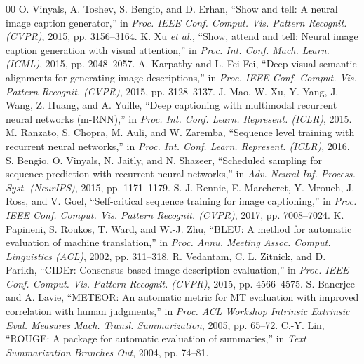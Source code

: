 \documentclass[conference]{IEEEtran}
\begin{document}
\begin{thebibliography}{00}
 O. Vinyals, A. Toshev, S. Bengio, and D. Erhan, ``Show and tell: A neural image caption generator,'' in \textit{Proc. IEEE Conf. Comput. Vis. Pattern Recognit. (CVPR)}, 2015, pp. 3156--3164.
 K. Xu \textit{et al.}, ``Show, attend and tell: Neural image caption generation with visual attention,'' in \textit{Proc. Int. Conf. Mach. Learn. (ICML)}, 2015, pp. 2048--2057.
 A. Karpathy and L. Fei-Fei, ``Deep visual-semantic alignments for generating image descriptions,'' in \textit{Proc. IEEE Conf. Comput. Vis. Pattern Recognit. (CVPR)}, 2015, pp. 3128--3137.
 J. Mao, W. Xu, Y. Yang, J. Wang, Z. Huang, and A. Yuille, ``Deep captioning with multimodal recurrent neural networks (m-RNN),'' in \textit{Proc. Int. Conf. Learn. Represent. (ICLR)}, 2015.
 M. Ranzato, S. Chopra, M. Auli, and W. Zaremba, ``Sequence level training with recurrent neural networks,'' in \textit{Proc. Int. Conf. Learn. Represent. (ICLR)}, 2016.
 S. Bengio, O. Vinyals, N. Jaitly, and N. Shazeer, ``Scheduled sampling for sequence prediction with recurrent neural networks,'' in \textit{Adv. Neural Inf. Process. Syst. (NeurIPS)}, 2015, pp. 1171--1179.
 S. J. Rennie, E. Marcheret, Y. Mroueh, J. Ross, and V. Goel, ``Self-critical sequence training for image captioning,'' in \textit{Proc. IEEE Conf. Comput. Vis. Pattern Recognit. (CVPR)}, 2017, pp. 7008--7024.
 K. Papineni, S. Roukos, T. Ward, and W.-J. Zhu, ``BLEU: A method for automatic evaluation of machine translation,'' in \textit{Proc. Annu. Meeting Assoc. Comput. Linguistics (ACL)}, 2002, pp. 311--318.
 R. Vedantam, C. L. Zitnick, and D. Parikh, ``CIDEr: Consensus-based image description evaluation,'' in \textit{Proc. IEEE Conf. Comput. Vis. Pattern Recognit. (CVPR)}, 2015, pp. 4566--4575.
 S. Banerjee and A. Lavie, ``METEOR: An automatic metric for MT evaluation with improved correlation with human judgments,'' in \textit{Proc. ACL Workshop Intrinsic Extrinsic Eval. Measures Mach. Transl. Summarization}, 2005, pp. 65--72.
 C.-Y. Lin, ``ROUGE: A package for automatic evaluation of summaries,'' in \textit{Text Summarization Branches Out}, 2004, pp. 74--81.

\end{thebibliography}
\end{document}

